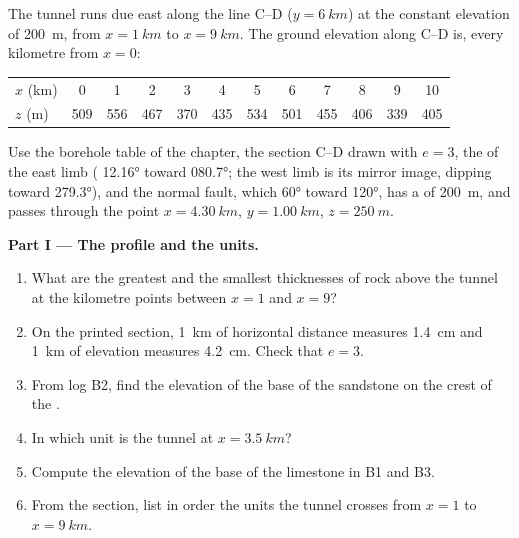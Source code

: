 \begin{problem}
\label{pb:b1:cross-sections:1}
The tunnel runs due east along the line C--D ($y = \qty{6}{km}$) at the
constant elevation of \qty{200}{m}, from $x = \qty{1}{km}$ to $x =
\qty{9}{km}$. The ground elevation along C--D is, every kilometre from
$x = 0$:
\begin{center}
\small
\begin{tabular}{lccccccccccc}
\hline
$x$ (km) & 0 & 1 & 2 & 3 & 4 & 5 & 6 & 7 & 8 & 9 & 10 \\
$z$ (m) & 509 & 556 & 467 & 370 & 435 & 534 & 501 & 455 & 406 & 339 & 405 \\
\hline
\end{tabular}
\end{center}
Use the borehole table of the chapter, the section C--D drawn with $e = 3$,
the  of the east limb ( \ang{12.16} toward \ang{080.7}; the west
limb is its mirror image, dipping toward \ang{279.3}), and the normal fault,
which  \ang{60} toward \ang{120}, has a  of \qty{200}{m}, and
passes through the point $x = \qty{4.30}{km}$, $y = \qty{1.00}{km}$,
$z = \qty{250}{m}$.

\medskip
\noindent\textbf{Part I --- The profile and the units.}
\begin{enumerate}
  \item What are the greatest and the smallest thicknesses of rock above the
        tunnel at the kilometre points between $x = 1$ and $x = 9$?
  \item On the printed section, \qty{1}{km} of horizontal distance measures
        \qty{1.4}{cm} and \qty{1}{km} of elevation measures \qty{4.2}{cm}.
        Check that $e = 3$.
  \item From log B2, find the elevation of the base of the sandstone on the
        crest of the .
  \item In which unit is the tunnel at $x = \qty{3.5}{km}$?
  \item Compute the elevation of the base of the limestone in B1 and B3.
  \item From the section, list in order the units the tunnel crosses from
        $x = 1$ to $x = \qty{9}{km}$.
\end{enumerate}


\end{problem}
